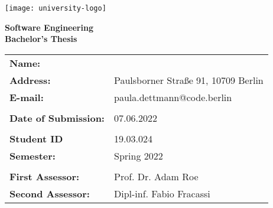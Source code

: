 \begin{titlepage}
	\begin{center}
		\texttt{[image: university-logo]}

		\vspace*{0.8cm}

		\textbf{Software Engineering}\\
		\textbf{Bachelor's Thesis}

		\vfill

		\textbf{\large\thetitle}
	\end{center}

	\vfill

	\noindent\hspace{1mm}\makebox[2in]{\rule{2in}{0.4mm}}
	\vspace{5mm}

	\begin{spacing}{1.1}
		\noindent
		\setlength{\tabcolsep}{20pt}
		\begin{tabular}{@{}ll}
		\textbf{Name:} & \theauthor \\
        \textbf{Address:} & Paulsborner Straße 91, 10709 Berlin \\
        \textbf{E-mail:} & paula.dettmann@code.berlin\\
        \\
        \textbf{Date of Submission:} & 07.06.2022\\
        \\
        \textbf{Student ID} & 19.03.024 \\
		\textbf{Semester:} & Spring 2022\\
		\\
		\textbf{First Assessor:} & Prof. Dr. Adam Roe\\
		\textbf{Second Assessor:} & Dipl-inf. Fabio Fracassi\\
		\end{tabular}
	\end{spacing}
\end{titlepage}
